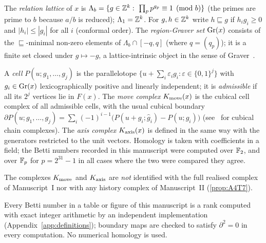 \begin{definition}\label{def:graver}
The \emph{relation lattice} of $x$ is $\Lambda_b=\{g\in\Z^k:\ \prod_pp^{g_p}\equiv1\pmod b\}$ (the primes are prime to $b$ because $a/b$ is reduced); $\Lambda_1=\mathbb Z^k$. For $g,h\in\mathbb Z^k$ write $h\sqsubseteq g$ if $h_ig_i\ge0$ and $|h_i|\le|g_i|$ for all $i$ (conformal order). The \emph{region-Graver set} $\mathrm{Gr}(x)$ consists of the $\sqsubseteq$-minimal non-zero elements of $\Lambda_b\cap[-q,q]$ (where $q=(q_p)$); it is a finite set closed under $g\mapsto-g$, a lattice-intrinsic object in the sense of Graver~\cite{Graver1975,Sturmfels1996}.
\end{definition}

\begin{definition}\label{def:Kmove}
A \emph{cell} $P(u;g_1,\dots,g_j)$ is the parallelotope $\{u+\sum_i\varepsilon_ig_i:\varepsilon\in\{0,1\}^j\}$ with $g_i\in\mathrm{Gr}(x)$ lexicographically positive and linearly independent; it is \emph{admissible} if all its $2^j$ vertices lie in $F(x)$. The \emph{move complex} $K_{\mathrm{move}}(x)$ is the cubical cell complex of all admissible cells, with the usual cubical boundary $\partial P(u;g_1,\dots,g_j)=\sum_i(-1)^{i-1}\bigl(P(u+g_i;\hat g_i)-P(u;\hat g_i)\bigr)$ (see~\cite{Kozlov2008} for cubical chain complexes). The \emph{axis complex} $K_{\mathrm{axis}}(x)$ is defined in the same way with the generators restricted to the unit vectors. Homology is taken with coefficients in a field; the Betti numbers recorded in this manuscript were computed over $\mathbb F_2$, and over $\mathbb F_p$ for $p=2^{31}-1$ in all cases where the two were compared they agree.
\end{definition}
The complexes $K_{\mathrm{move}}$ and $K_{\mathrm{axis}}$ are \emph{not} identified with the full realised complex of Manuscript~I nor with any history complex of Manuscript~II (\cref{prop:A4T7}).

\begin{remark}\label{rem:exact}
Every Betti number in a table or figure of this manuscript is a rank computed with exact integer arithmetic by an independent implementation (Appendix~\ref{app:definitions}); boundary maps are checked to satisfy $\partial^2=0$ in every computation. No numerical homology is used.
\end{remark}


